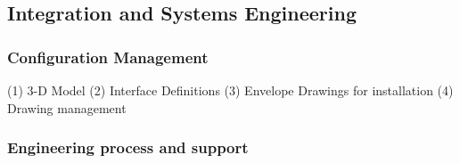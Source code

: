 \subsection{Integration and Systems Engineering }
\label{sec:fdsp-coord-integ-sysengr}

\subsubsection{Configuration Management}
\label{sec:fdsp-coord-integ-config}
  	
   (1)	3-D Model
   (2)	Interface Definitions
   (3)	Envelope Drawings for installation
   (4)	Drawing management

\subsubsection{Engineering process and support}
\label{sec:fdsp-coord-integ-engr-proc}
 

